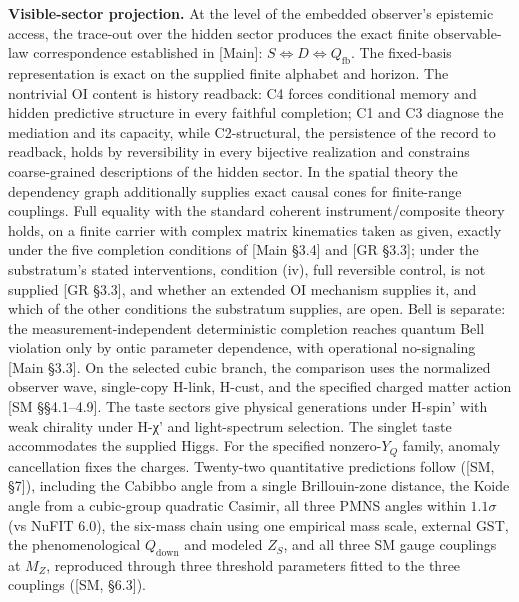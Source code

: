 \documentclass[
]{article}
\begin{document}
\textbf{Visible-sector projection.} At the level of the embedded
observer's epistemic access, the trace-out over the hidden sector
produces the exact finite observable-law correspondence established in
{[}Main{]}: \(S\iff D\iff Q_{\mathrm{fb}}\). The fixed-basis
representation is exact on the supplied finite alphabet and horizon. The
nontrivial OI content is history readback: C4 forces conditional memory
and hidden predictive structure in every faithful completion; C1 and C3
diagnose the mediation and its capacity, while C2-structural, the
persistence of the record to readback, holds by reversibility in every
bijective realization and constrains coarse-grained descriptions of the
hidden sector. In the spatial theory the dependency graph additionally
supplies exact causal cones for finite-range couplings. Full equality
with the standard coherent instrument/composite theory holds, on a
finite carrier with complex matrix kinematics taken as given, exactly
under the five completion conditions of {[}Main §3.4{]} and {[}GR
§3.3{]}; under the substratum's stated interventions, condition (iv),
full reversible control, is not supplied {[}GR §3.3{]}, and whether an
extended OI mechanism supplies it, and which of the other conditions the
substratum supplies, are open. Bell is separate: the
measurement-independent deterministic completion reaches quantum Bell
violation only by ontic parameter dependence, with operational
no-signaling {[}Main §3.3{]}. On the selected cubic branch, the
comparison uses the normalized observer wave, single-copy H-link,
H-cust, and the specified charged matter action {[}SM §§4.1--4.9{]}. The
taste sectors give physical generations under H-spin' with weak
chirality under H-χ' and light-spectrum selection. The singlet taste
accommodates the supplied Higgs. For the specified nonzero-\(Y_Q\)
family, anomaly cancellation fixes the charges. Twenty-two quantitative
predictions follow ({[}SM, §7{]}), including the Cabibbo angle from a
single Brillouin-zone distance, the Koide angle from a cubic-group
quadratic Casimir, all three PMNS angles within \(1.1\sigma\) (vs NuFIT
6.0), the six-mass chain using one empirical mass scale, external GST,
the phenomenological \(Q_{\text{down}}\) and modeled \(Z_S\), and all
three SM gauge couplings at \(M_Z\), reproduced through three threshold
parameters fitted to the three couplings ({[}SM, §6.3{]}).
\end{document}
